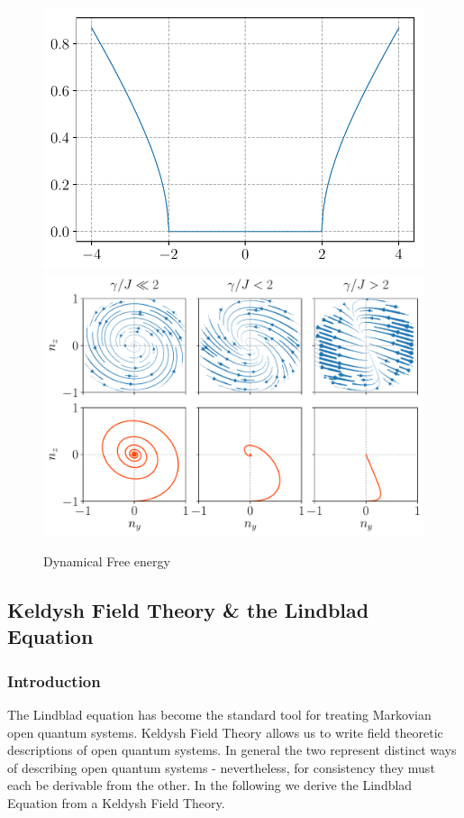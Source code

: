 \documentclass{article}
\begin{document}
\begin{figure}[h]
    \includegraphics[width=0.49\linewidth]{bare_transition.pdf}
    \includegraphics[width=0.5\linewidth]{diss.pdf}
    \caption{Dynamical Free energy}\label{fig:dyn}
\end{figure}

%
\subsection{Keldysh Field Theory \& the Lindblad Equation}\label{sec:open}
%
\subsubsection{Introduction}
The Lindblad equation has become the standard tool for treating Markovian open quantum systems. 
Keldysh Field Theory allows us to write field theoretic descriptions of open quantum systems. 
In general the two represent distinct ways of describing open quantum systems - nevertheless, for consistency they must each be derivable from the other. 
In the following we derive the Lindblad Equation from a Keldysh Field Theory.
\end{document}
